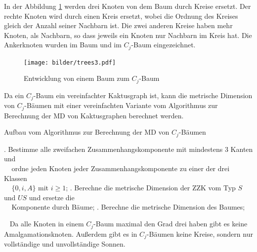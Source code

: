 \begin{bsp}
In der Abbildung \ref{c_jbaum} werden drei Knoten von dem Baum durch Kreise ersetzt. Der rechte Knoten wird durch einen Kreis ersetzt, wobei die Ordnung des Kreises gleich der Anzahl seiner Nachbarn ist. Die zwei anderen Kreise haben mehr Knoten, als Nachbarn, so dass jeweils ein Knoten nur Nachbarn im Kreis hat. Die Ankerknoten wurden im Baum und im $C_j$-Baum eingezeichnet.\\
\vspace{-4mm}
\begin{figure}[h!]
		\centering 		 
   \texttt{[image: bilder/trees3.pdf]}
	\caption{Entwicklung von einem Baum zum $C_{j}$-Baum}
	\label{c_jbaum}
  	 \end{figure}
\vspace{-4mm}
\end{bsp}
\begin{bem}
Da ein $C_j$-Baum ein vereinfachter Kaktusgraph ist, kann die metrische Dimension von $C_j$-Bäumen mit einer vereinfachten Variante vom Algorithmus zur Berechnung der MD von Kaktusgraphen berechnet werden.
\begin{algorithm}
\caption{Aufbau vom Algorithmus zur Berechnung der MD von $C_j$-Bäumen}
\begin{algorithmic}
. Bestimme alle zweifachen Zusammenhangskomponente mit mindestens 3 Kanten und\\$\;\;\;\;$ordne jeden Knoten jeder Zusammenhangskomponente zu einer der drei Klassen\\$\;\;\;\;\{0,i,A\}$ mit $i \geq 1$;
. Berechne die metrische Dimension der ZZK vom Typ $S$ und $US$ und ersetze die\\$\;\;\;\;$Komponente durch Bäume;
. Berechne die metrische Dimension des Baumes;
\end{algorithmic}
\end{algorithm}
~\linebreak
Da alle Knoten in einem $C_j$-Baum maximal den Grad drei haben gibt es keine Amalgamationsknoten. Außerdem gibt es in $C_j$-Bäumen keine Kreise, sondern nur vollständige und unvollständige Sonnen.
\end{bem}

